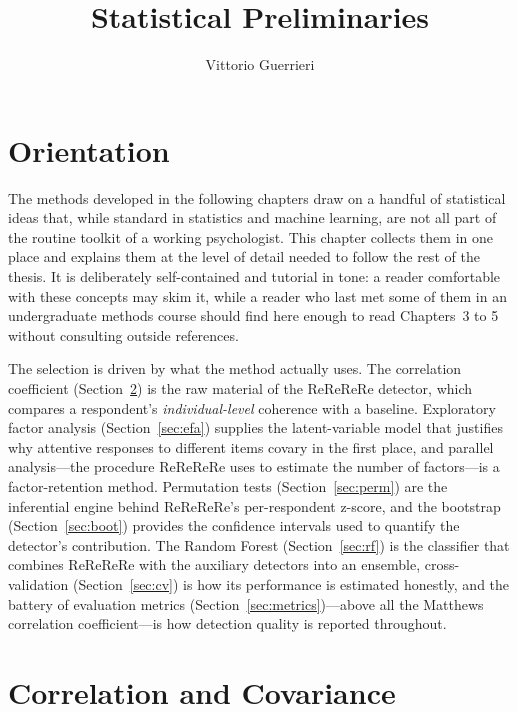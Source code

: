 \documentclass[doc,11pt,donotrepeattitle]{apa7}
\title{Statistical Preliminaries}
\author{Vittorio Guerrieri}
\affiliation{Chapter~2 of the thesis}
\begin{document}
\maketitle

\section{Orientation}

The methods developed in the following chapters draw on a handful of
statistical ideas that, while standard in statistics and machine learning, are
not all part of the routine toolkit of a working psychologist. This chapter
collects them in one place and explains them at the level of detail needed to
follow the rest of the thesis. It is deliberately self-contained and tutorial in
tone: a reader comfortable with these concepts may skim it, while a reader who
last met some of them in an undergraduate methods course should find here
enough to read Chapters~3 to 5 without consulting outside references.

The selection is driven by what the method actually uses. The
correlation coefficient (Section~\ref{sec:corr}) is the raw material of the
ReReReRe detector, which compares a respondent's \emph{individual-level}
coherence with a baseline. Exploratory factor analysis
(Section~\ref{sec:efa}) supplies the latent-variable model that justifies why
attentive responses to different items covary in the first place, and parallel
analysis---the procedure ReReReRe uses to estimate the number of factors---is a
factor-retention method. Permutation tests (Section~\ref{sec:perm}) are the
inferential engine behind ReReReRe's per-respondent z-score, and the bootstrap
(Section~\ref{sec:boot}) provides the confidence intervals used to quantify the
detector's contribution. The Random Forest (Section~\ref{sec:rf}) is the
classifier that combines ReReReRe with the auxiliary detectors into an
ensemble, cross-validation (Section~\ref{sec:cv}) is how its performance is
estimated honestly, and the battery of evaluation metrics
(Section~\ref{sec:metrics})---above all the Matthews correlation
coefficient---is how detection quality is reported throughout.

\section{Correlation and Covariance}
\label{sec:corr}
\end{document}
